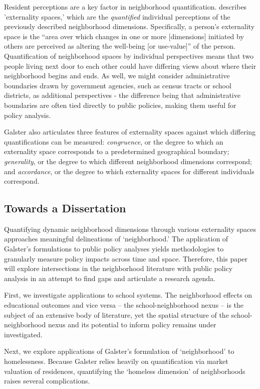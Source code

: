 Resident perceptions are a key factor in neighborhood quantification.
\cite{galster1986WhatNeighbourhood} describes 'externality spaces,'
which are the \emph{quantified} individual perceptions of the
previously described neighborhood dimensions. Specifically, a person's
externality space is the ``area over which changes in one or more
[dimensions] initiated by others are perceived as altering the
well-being [or use-value]'' of the
person. \cite{galster2001NatureNeighbourhood} Quantification of
neighborhood spaces by individual perspectives means that two people
living next door to each other could have differing views about where
their neighborhood begins and ends. As well, we might consider
administrative boundaries drawn by government agencies, such as census
tracts or school districts, as additional perspectives - the
difference being that administrative boundaries are often tied
directly to public policies, making them useful for policy analysis.

Galster also articulates three features of externality spaces against
which differing quantifications can be measured: \emph{congruence}, or
the degree to which an externality space corresponds to a
predetermined geographical boundary; \emph{generality}, or the degree
to which different neighborhood dimensions correspond; and
\emph{accordance}, or the degree to which externality spaces for
different individuals correspond.

\subsection{Towards a Dissertation}

Quantifying dynamic neighborhood dimensions through various
externality spaces approaches meaningful delineations of
`neighborhood.' The application of Galster's formulations to public
policy analyses yields methodologies to granularly measure policy
impacts across time and space. Therefore, this paper will explore
intersections in the neighborhood literature with public policy
analysis in an attempt to find gaps and articulate a research agenda.

First, we investigate applications to school systems. The neighborhood
effects on educational outcomes and vice versa -- the
school-neighborhood nexus -- is the subject of an extensive body of
literature, yet the spatial structure of the school-neighborhood nexus
and its potential to inform policy remains under investigated.

Next, we explore applications of Galster's formulation of
`neighborhood' to homelessness. Because Galster relies heavily on
quantification via market valuation of residences, quantifying the
`homeless dimension' of neighborhoods raises several complications.

